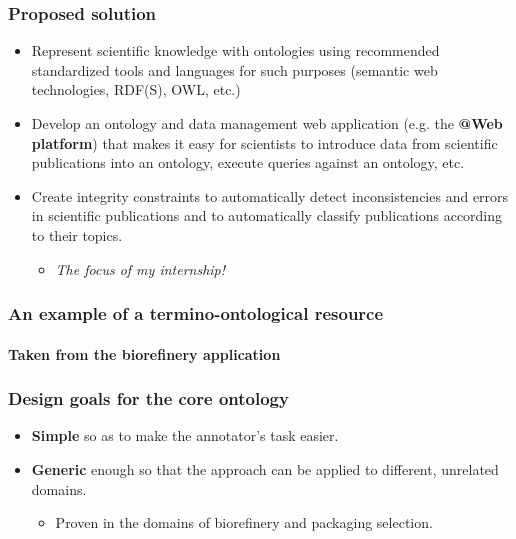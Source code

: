 \documentclass{beamer}
\begin{document}
\begin{frame}
  \frametitle{Proposed solution}

  \begin{itemize}
    \item Represent scientific knowledge with ontologies using recommended
      standardized tools and languages for such purposes (semantic web
      technologies, RDF(S), OWL, etc.)

    \pause

    \item Develop an ontology and data management web application (e.g. the
      \textbf{@Web platform}) that makes it easy for scientists to introduce
      data from scientific publications into an ontology, execute queries
      against an ontology, etc.

    \pause

    \item Create integrity constraints to automatically detect inconsistencies
      and errors in scientific publications and to automatically classify
      publications according to their topics.

    \pause

    \begin{itemize}
      \item \textit{The focus of my internship!}
    \end{itemize}

  \end{itemize}
\end{frame}

\begin{frame}
  \frametitle{An example of a termino-ontological resource}
  \framesubtitle{Taken from the biorefinery application}

  \begin{center}
  \end{center}
\end{frame}

\begin{frame}
  \frametitle{Design goals for the core ontology}

  \begin{itemize}
    \item \textbf{Simple} so as to make the annotator's task easier.

    \pause

    \item \textbf{Generic} enough so that the approach can be applied to
      different, unrelated domains.

    \pause

    \begin{itemize}
      \item Proven in the domains of biorefinery and packaging selection.
    \end{itemize}
  \end{itemize}
\end{frame}
\end{document}
